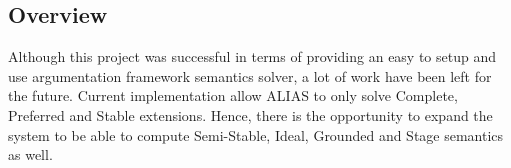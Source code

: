 \subsection{Overview}

Although this project was successful in terms of providing an easy to setup and use argumentation framework semantics solver, a lot of work have been left for the future. Current implementation allow ALIAS to only solve Complete, Preferred and Stable extensions. Hence, there is the opportunity to expand the system to be able to compute Semi-Stable, Ideal, Grounded and Stage semantics as well. 